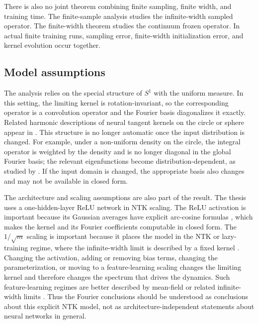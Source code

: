 There is also no joint theorem combining finite sampling, finite width, and
training time. The finite-sample analysis studies the infinite-width sampled
operator. The finite-width theorem studies the continuum frozen operator. In
actual finite training runs, sampling error, finite-width initialization error,
and kernel evolution occur together.

\subsection{Model assumptions}
\label{subsec:discussion-limitations-model}

The analysis relies on the special structure of \(S^1\) with the uniform
measure. In this setting, the limiting kernel is rotation-invariant, so the
corresponding operator is a convolution operator and the Fourier basis
diagonalizes it exactly. Related harmonic descriptions of neural tangent kernels
on the circle or sphere appear in
\citet{basri2019convergence,basri2020frequencybiasneuralnetworks,bietti2019inductivebiasneuraltangent,cao2020understandingspectralbiasdeep}.
This structure is no longer automatic once the input distribution is changed.
For example, under a non-uniform density on the circle, the integral operator is
weighted by the density and is no longer diagonal in the global Fourier basis;
the relevant eigenfunctions become distribution-dependent, as studied by
\citet{basri2020frequencybiasneuralnetworks}. If the input domain is changed,
the appropriate basis also changes and may not be available in closed form.

The architecture and scaling assumptions are also part of the result. The thesis
uses a one-hidden-layer ReLU network in NTK scaling. The ReLU activation is
important because its Gaussian averages have explicit arc-cosine formulas
\citep{cho2009kernel}, which makes the kernel and its Fourier coefficients
computable in closed form. The \(1/\sqrt m\) scaling is important because it
places the model in the NTK or lazy-training regime, where the infinite-width
limit is described by a fixed kernel
\citep{jacot2018ntk,lee2020wide,golikov2022neuraltangentkernelsurvey}.
Changing the activation, adding or removing bias terms, changing the
parameterization, or moving to a feature-learning scaling changes the limiting
kernel and therefore changes the spectrum that drives the dynamics. Such
feature-learning regimes are better described by mean-field or related
infinite-width limits
\citep{Mei2018meanfieldview,chizat2018globalconvergencegradientdescent,sirignano2019meanfieldanalysisneural,Rotskoff_2022}.
Thus the Fourier conclusions should be understood as conclusions about this
explicit NTK model, not as architecture-independent statements about neural
networks in general.

